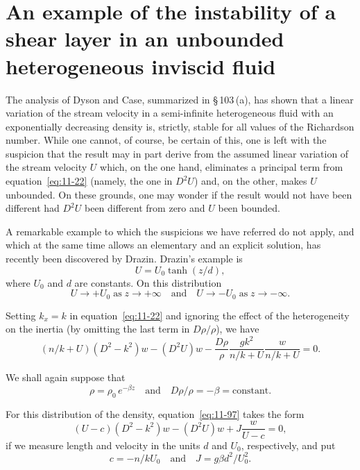 \section{An example of the instability of a shear layer in an unbounded heterogeneous inviscid fluid}\label{sec:104}

The analysis of Dyson and Case, summarized in \S\,103\,(a), has shown that a linear variation of the stream velocity in a semi-infinite heterogeneous fluid with an exponentially decreasing density is, strictly, stable for all values of the Richardson number. While one cannot, of course, be certain of this, one is left with the suspicion that the result may in part derive from the assumed linear variation of the stream velocity $U$ which, on the one hand, eliminates a principal term from equation~\eqref{eq:11-22} (namely, the one in $D^2U$) and, on the other, makes $U$ unbounded. On these grounds, one may wonder if the result would not have been different had $D^2U$ been different from zero and $U$ been bounded.

A remarkable example to which the suspicions we have referred do not apply, and which at the same time allows an elementary and an explicit solution, has recently been discovered by Drazin. Drazin's example is
\begin{equation}
\label{eq:11-95}
U = U_0\tanh(z/d),
\end{equation}
where $U_0$ and $d$ are constants. On this distribution
\begin{equation}
\label{eq:11-96}
U \to +U_0 \;\text{as}\; z \to +\infty \quad\text{and}\quad U \to -U_0 \;\text{as}\; z \to -\infty.
\end{equation}

Setting $k_x = k$ in equation~\eqref{eq:11-22} and ignoring the effect of the heterogeneity on the inertia (by omitting the last term in $D\rho/\rho$), we have
\begin{equation}
\label{eq:11-97}
(n/k+U)(D^2-k^2)w-(D^2U)w-\frac{D\rho}{\rho}\frac{gk^2}{n/k+U}\frac{w}{n/k+U} = 0.
\end{equation}

We shall again suppose that
\begin{equation}
\label{eq:11-98}
\rho = \rho_0\,e^{-\beta z} \quad\text{and}\quad D\rho/\rho = -\beta = \text{constant}.
\end{equation}

For this distribution of the density, equation~\eqref{eq:11-97} takes the form
\begin{equation}
\label{eq:11-99}
(U-c)(D^2-k^2)w-(D^2U)w+J\frac{w}{U-c} = 0,
\end{equation}
if we measure length and velocity in the units $d$ and $U_0$, respectively, and put
\begin{equation}
\label{eq:11-100}
c = -n/kU_0 \quad\text{and}\quad J = g\beta d^2/U_0^2.
\end{equation}

